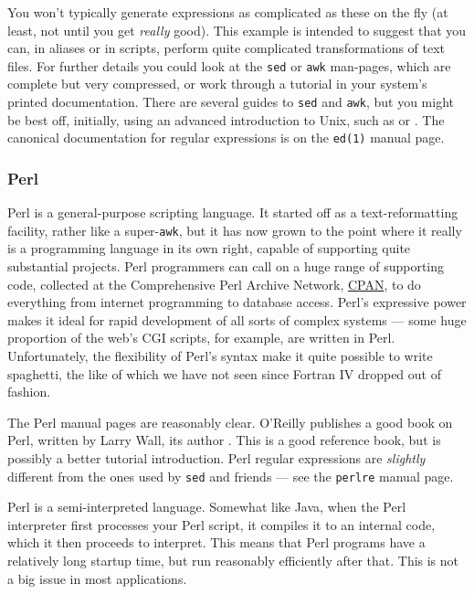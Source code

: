 \documentclass[11pt,oneside,chapters]{starlink}
\begin{document}
You won't typically generate expressions as complicated
as these on the fly (at least, not until you get
\emph{really} good).  This example is intended to
suggest that you can, in aliases or in scripts, perform
quite complicated transformations of text files.  For
further details you could look at the \texttt{sed}
or \texttt{awk} man-pages, which are complete but
very compressed, or work through a tutorial in your
system's printed documentation.  There are several
guides to \texttt{sed} and \texttt{awk}, but you
might be best off, initially, using an advanced
introduction to Unix, such as
\citet{quigley} or
\citet{nutshell}.  The canonical
documentation for regular expressions is on the
\texttt{ed(1)} manual page.

\subsubsection{Perl}


Perl is a general-purpose scripting language.  It
started off as a text-reformatting facility, rather like
a super-\texttt{awk}, but it has now grown to the
point where it really is a programming language in its
own right, capable of supporting quite substantial
projects.  Perl programmers can call on a huge range of
supporting code, collected at the Comprehensive Perl
Archive Network, \href{http://www.cpan.org}{CPAN},
to do everything from internet programming to database access.
Perl's expressive power makes it ideal for rapid
development of all sorts of complex systems --- some huge
proportion of the web's CGI scripts, for example, are
written in Perl.  Unfortunately, the flexibility of
Perl's syntax make it quite possible to write spaghetti,
the like of which we have not seen since Fortran IV
dropped out of fashion.

The Perl manual pages
are reasonably clear.  O'Reilly publishes a good book on
Perl, written by Larry Wall, its author
\citep{wall}.  This is a good reference
book, but \citet{schwartz97} is possibly a
better tutorial introduction.  Perl regular expressions
are \emph{slightly} different from the ones used by
\texttt{sed} and friends --- see the
\texttt{perlre} manual page.

Perl is a
semi-interpreted language.  Somewhat like Java, when the
Perl interpreter first processes your Perl script, it
compiles it to an internal code, which it then proceeds
to interpret.  This means that Perl programs have a
relatively long startup time, but run reasonably
efficiently after that.  This is not a big issue in most
applications.
\end{document}
